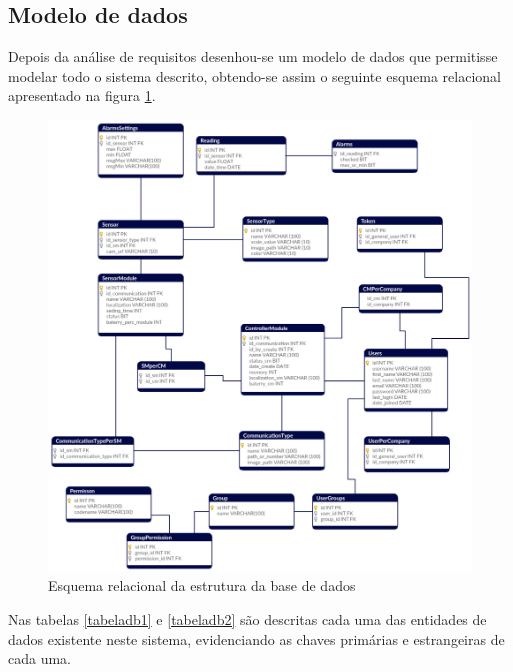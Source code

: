 \newpage
\subsection{Modelo de dados}

Depois da análise de requisitos desenhou-se um modelo de dados que permitisse modelar todo o sistema descrito, obtendo-se assim o seguinte esquema relacional apresentado na figura \ref{esquemarelacional}.





\begin{figure}[!htb]
	\centering
	\includegraphics[width=\linewidth]{esquemas/database_tese.pdf}
	\caption{Esquema relacional da estrutura da base de dados}
	\label{esquemarelacional}
\end{figure}


Nas tabelas \ref{tabeladb1} e \ref{tabeladb2} são descritas cada uma das entidades de dados existente neste sistema, evidenciando as chaves primárias e estrangeiras de cada uma. 



